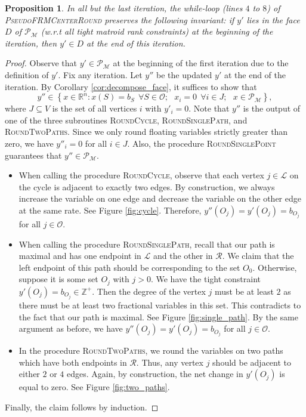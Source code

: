 \documentclass[a4paper,11pt]{article}
\newtheorem{proposition}[theorem]{Proposition}
\newcommand{\R}{\mathcal{R}}
\newcommand{\M}{\mathcal{M}}
\renewcommand{\O}{\mathcal{O}}
\renewcommand{\L}{\mathcal{L}}
\renewcommand{\P}{\mathcal{P}}
\begin{document}
\begin{proposition} In all but the last iteration, the while-loop (lines $4$ to $8$) of \textsc{PseudoFRMCenterRound} preserves the following invariant: if $y'$ lies in the face $D$ of $\P_\M$ (w.r.t all tight matroid rank constraints) at the beginning of the iteration, then $y' \in D$ at the end of this iteration.
\label{prop:invariant}
\end{proposition}
\begin{proof}
Observe that $y' \in \P_\M$ at the beginning of the first iteration due to the definition of $y'$. Fix any iteration. Let $y''$ be the updated $y'$ at the end of the iteration. By Corollary \ref{cor:decompose_face}, it suffices to show that
$$ y'' \in \left\{x \in \mathbb{R}^{n}: x(S) = b_S~~\forall S \in \O; ~~~ x_i = 0 ~~\forall i \in J; ~~~ x \in \P_\M  \right\}, $$
where $J \subseteq V$ is the set of all vertices $i$ with $y'_i = 0$. Note that $y''$ is the output of one of the three subroutines \textsc{RoundCycle}, \textsc{RoundSinglePath}, and \textsc{RoundTwoPaths}. Since we only round floating variables strictly greater than zero, we have  $y''_i = 0$ for all $i \in J$. Also, the procedure \textsc{RoundSinglePoint} guarantees that $y'' \in \P_\M$.
\begin{itemize}
	\item When calling the procedure \textsc{RoundCycle}, observe that each vertex $j \in \L$ on the cycle is adjacent to exactly two edges. By construction, we always increase the variable on one edge and decrease the variable on the other edge at the same rate. See Figure \ref{fig:cycle}. Therefore, $y''(O_j) = y'(O_j) = b_{O_j}$ for all $j \in \O$.
	\item When calling the procedure \textsc{RoundSinglePath}, recall that our path is maximal and has one endpoint in $\L$ and the other in $\R$. We claim that the left endpoint of this path should be corresponding to the set $O_0$. Otherwise, suppose it is some set $O_j$ with $j>0$. We have the tight constraint $y'(O_j) = b_{O_j} \in \mathbb{Z}^+$. Then the degree of the vertex $j$ must be at least $2$ as there must be at least two fractional variables in this set. This contradicts to the fact that our path is maximal. See Figure \ref{fig:single_path}. By the same argument as before, we have $y''(O_j) = y'(O_j) = b_{O_j}$ for all $j \in \O$.
	\item In the procedure \textsc{RoundTwoPaths}, we round the variables on two paths which have both endpoints in $\R$. Thus, any vertex $j$ should be adjacent to either $2$ or $4$ edges. Again, by construction, the net change in $y'(O_j)$ is equal to zero. See Figure \ref{fig:two_paths}.
\end{itemize}
Finally, the claim follows by induction.
\end{proof}
\end{document}
